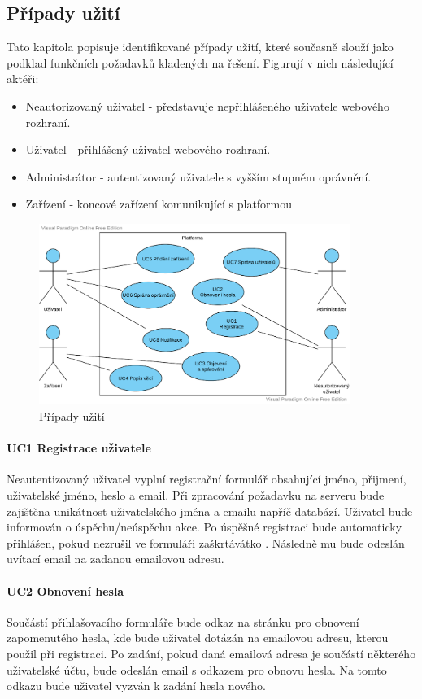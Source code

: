 \subsection{Případy užití}
Tato kapitola popisuje identifikované případy užití, které současně slouží jako podklad funkčních požadavků kladených na řešení. Figurují v nich následující aktéři:
\begin{itemize}
    \item Neautorizovaný uživatel - představuje nepřihlášeného uživatele webového rozhraní.
    \item Uživatel - přihlášený uživatel webového rozhraní.
    \item Administrátor - autentizovaný uživatele s vyšším stupněm oprávnění.
    \item Zařízení - koncové zařízení komunikující s platformou
\end{itemize}

\begin{figure}[htbp]
    \centering
    \includegraphics[width=0.9\textwidth]{img/use_case.pdf}
    \caption{Případy užití}
\end{figure}

\paragraph{UC1 Registrace uživatele}
Neautentizovaný uživatel vyplní registrační formulář obsahující jméno, přijmení, uživatelské jméno, heslo a email. Při zpracování požadavku na serveru bude zajištěna unikátnost uživatelského jména a emailu napříč databází. Uživatel bude informován o úspěchu/neúspěchu akce. Po úspěšné registraci bude automaticky přihlášen, pokud nezrušil ve formuláři zaškrtávátko . Následně mu bude odeslán uvítací email na zadanou emailovou adresu.

\paragraph{UC2 Obnovení hesla}
Součástí přihlašovacího formuláře bude odkaz na stránku pro obnovení zapomenutého hesla, kde bude uživatel dotázán na emailovou adresu, kterou použil při registraci. Po zadání, pokud daná emailová adresa je součástí některého uživatelské účtu, bude odeslán email s odkazem pro obnovu hesla. Na tomto odkazu bude uživatel vyzván k zadání hesla nového.

